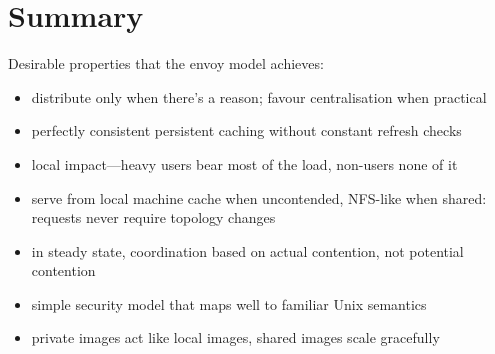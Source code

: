 \section{Summary}

Desirable properties that the envoy model achieves:

\begin{itemize}
\item distribute only when there's a reason; favour centralisation when practical
\item perfectly consistent persistent caching without constant refresh checks
\item local impact---heavy users bear most of the load, non-users none of it
\item serve from local machine cache when uncontended, NFS-like when shared: requests never require topology changes
\item in steady state, coordination based on actual contention, not potential contention
\item simple security model that maps well to familiar Unix semantics
\item private images act like local images, shared images scale gracefully
\end{itemize}

